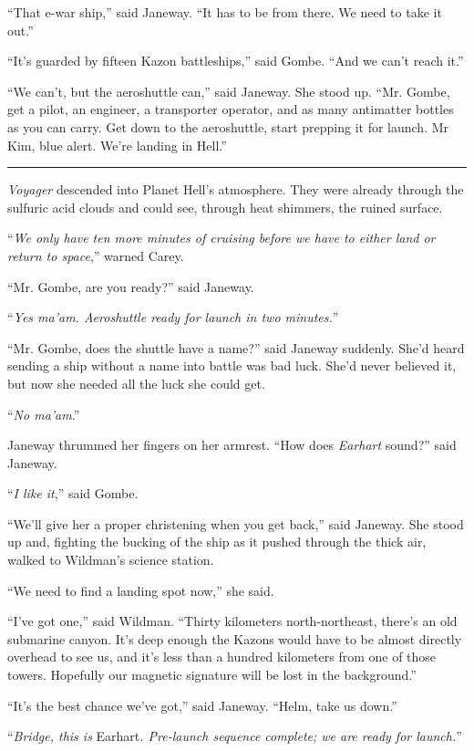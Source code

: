 \documentclass[twoside,letterpaper,12pt]{memoir}
\begin{document}
``That e-war ship,'' said Janeway. ``It has to be from there. We need to take it out.''

``It's guarded by fifteen Kazon battleships,'' said Gombe. ``And we can't reach it.''

``We can't, but the aeroshuttle can,'' said Janeway. She stood up. ``Mr. Gombe, get a pilot, an engineer, a transporter operator, and as many antimatter bottles as you can carry. Get down to the aeroshuttle, start prepping it for launch. Mr Kim, blue alert. We're landing in Hell.''

\fancybreak{\rule{3cm}{0.4 pt}}
\textit{Voyager} descended into Planet Hell's atmosphere. They were already through the sulfuric acid clouds and could see, through heat shimmers, the ruined surface.

``\textit{We only have ten more minutes of cruising before we have to either land or return to space},'' warned Carey.

``Mr. Gombe, are you ready?'' said Janeway.

``\textit{Yes ma'am. Aeroshuttle ready for launch in two minutes.}''

``Mr. Gombe, does the shuttle have a name?'' said Janeway suddenly. She'd heard sending a ship without a name into battle was bad luck. She'd never believed it, but now she needed all the luck she could get.

``\textit{No ma'am}.''

Janeway thrummed her fingers on her armrest. ``How does \textit{Earhart} sound?'' said Janeway.

``\textit{I like it},'' said Gombe.

``We'll give her a proper christening when you get back,'' said Janeway. She stood up and, fighting the bucking of the ship as it pushed through the thick air, walked to Wildman's science station.

``We need to find a landing spot now,'' she said.

``I've got one,'' said Wildman. ``Thirty kilometers north-northeast, there's an old submarine canyon. It's deep enough the Kazons would have to be almost directly overhead to see us, and it's less than a hundred kilometers from one of those towers. Hopefully our magnetic signature will be lost in the background.''

``It's the best chance we've got,'' said Janeway. ``Helm, take us down.''

``\textit{Bridge, this is }Earhart\textit{. Pre-launch sequence complete; we are ready for launch.}''
\end{document}
